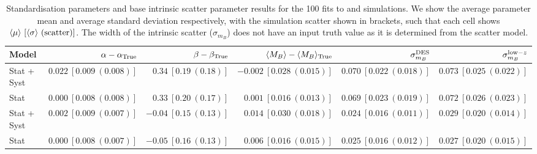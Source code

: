 \documentclass[a4paper,fleqn,usenatbib]{emulateapj}
\newcommand{\gten}{\citetalias{Guy2010}}
\newcommand{\celeven}{\citetalias{Chotard2011}}
\begin{document}
\begin{table}
	\centering
	\caption{Standardisation parameters and base intrinsic scatter parameter results for the 100 fits to {\gten} and {\celeven} simulations. We show the average parameter mean and average standard deviation respectively, with the simulation scatter shown in brackets, such that each cell shows $\langle\mu\rangle\ [\langle\sigma\rangle\ ({\rm scatter})]$. The width of the intrinsic scatter ($\sigma_{m_B}$) does not have an input truth value as it is determined from the scatter model.}
	\label{tab:standardisation}
	\begin{tabular}{l|rrrrr}
		\hline
		Model & $\alpha - \alpha_{\rm True}$ & $\beta - \beta_{\rm True}$ & $\langle M_B \rangle - \langle M_B \rangle_{\rm True}$ & $\sigma_{m_B}^{\rm DES}$ & $\sigma_{m_B}^{{\rm low-}z}$ \\
		\hline
		{\gten} Stat + Syst  & $0.022 \ [0.009\ (0.008)]$ & $ 0.34 \ [0.19\ (0.18)]$ & $-0.002 \ [0.028\ (0.015)]$ & $0.070 \ [0.022\ (0.018)]$ & $0.073 \ [0.025\ (0.022)]$\\
		{\gten}  Stat         & $0.000 \ [0.008\ (0.008)]$ & $0.33 \ [0.20\ (0.17)]$ & $0.001 \ [0.016\ (0.013)]$ & $0.069 \ [0.023\ (0.019)]$ & $0.072 \ [0.026\ (0.023)]$\\
		{\celeven} Stat + Syst  &  $0.002 \ [0.009\ (0.007)]$ & $-0.04 \ [0.15\ (0.13)]$ & $0.014 \ [0.030\ (0.018)]$ & $0.024 \ [0.016\ (0.011)]$ & $0.029 \ [0.020\ (0.014)]$ \\
		{\celeven} Stat         &  $0.000 \ [0.008\ (0.007)]$ & $-0.05 \ [0.16\ (0.13)]$ & $0.006 \ [0.016\ (0.015)]$ & $0.025 \ [0.016\ (0.012)]$ & $0.027 \ [0.020\ (0.015)]$\\
		\hline
	\end{tabular}
\end{table}
\end{document}
